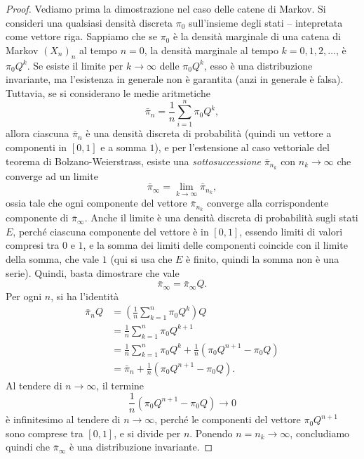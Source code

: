\documentclass[
  italian,
  letterpaper,
]{book}
\newcommand{\bra}[1]{\left( #1 \right)}
\theoremstyle{definition}
\theoremstyle{remark}
\begin{document}
\begin{proof}
Vediamo prima la dimostrazione nel caso delle catene di Markov. Si
consideri una qualsiasi densità discreta \(\pi_0\) sull'insieme degli
stati -- intepretata come vettore riga. Sappiamo che se \(\pi_0\) è la
densità marginale di una catena di Markov \((X_n)_n\) al tempo \(n=0\),
la densità marginale al tempo \(k=0,1,2,\ldots\), è \(\pi_0 Q^k\). Se
esiste il limite per \(k \to \infty\) delle \(\pi_0 Q^k\), esso è una
distribuzione invariante, ma l'esistenza in generale non è garantita
(anzi in generale è falsa). Tuttavia, se si considerano le medie
aritmetiche \[ \bar{\pi}_n = \frac 1 n \sum_{i=1}^n \pi_0 Q^k,\] allora
ciascuna \(\bar{\pi}_n\) è una densità discreta di probabilità (quindi
un vettore a componenti in \([0,1]\) e a somma \(1\)), e per
l'estensione al caso vettoriale del teorema di Bolzano-Weierstrass,
esiste una \emph{sottosuccessione} \(\bar{\pi}_{n_k}\) con
\(n_k \to \infty\) che converge ad un limite
\[ \bar{\pi}_\infty = \lim_{k \to \infty} \bar{\pi}_{n_k},\] ossia tale
che ogni componente del vettore \(\bar{\pi}_{n_k}\) converge alla
corrispondente componente di \(\bar{\pi}_\infty\). Anche il limite è una
densità discreta di probabilità sugli stati \(E\), perché ciascuna
componente del vettore è in \([0,1]\), essendo limiti di valori compresi
tra \(0\) e \(1\), e la somma dei limiti delle componenti coincide con
il limite della somma, che vale \(1\) (qui si usa che \(E\) è finito,
quindi la somma non è una serie). Quindi, basta dimostrare che vale
\[ \bar{\pi}_\infty = \bar{\pi}_\infty Q.\] Per ogni \(n\), si ha
l'identità
\[ \begin{split} \bar{\pi}_n Q & = \bra{ \frac 1 n \sum_{k=1}^n \pi_0 Q^k} Q \\
& = \frac 1 n \sum_{k=1}^n \pi_0 Q^{k+1} \\
& = \frac{1}{n}\sum_{k=1}^n \pi_0 Q^{k} + \frac{1}{n}\bra{ \pi_0 Q^{n+1} - \pi_0 Q}\\
& = \bar{\pi}_n + \frac{1}{n}\bra{ \pi_0 Q^{n+1} - \pi_0 Q}.\end{split}\]
Al tendere di \(n \to \infty\), il termine
\[  \frac{1}{n}\bra{ \pi_0 Q^{n+1} - \pi_0 Q} \to 0\] è infinitesimo al
tendere di \(n \to \infty\), perché le componenti del vettore
\(\pi_0 Q^{n+1}\) sono comprese tra \([0,1]\), e si divide per \(n\).
Ponendo \(n = n_k \to \infty\), concludiamo quindi che
\(\bar{\pi}_\infty\) è una distribuzione invariante.


\end{proof}
\end{document}
